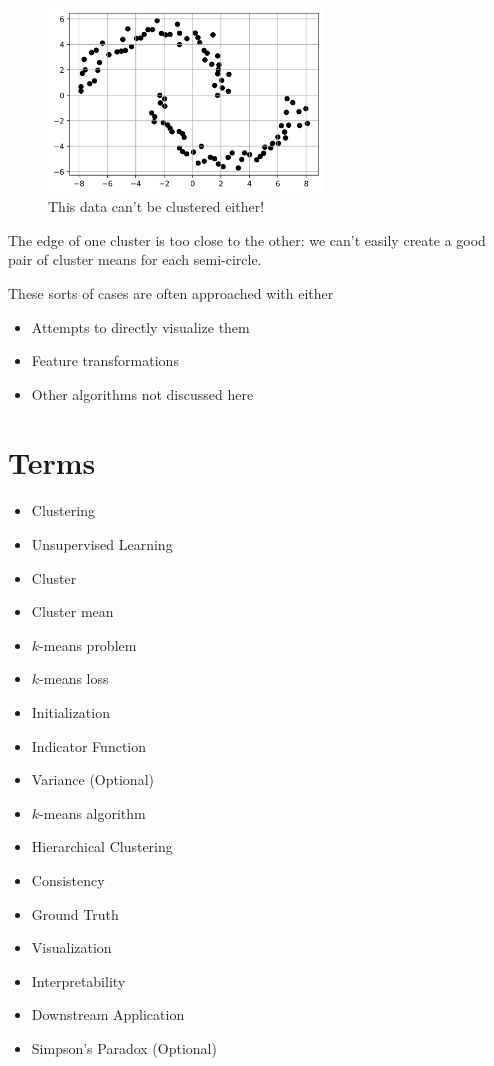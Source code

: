         \begin{figure}[h]
            \centering
            \includegraphics[width=0.65\textwidth]{images/clustering_images/offset_unclusterable.png}
            \caption*{This data can't be clustered either!}
        \end{figure}
        
        The edge of one cluster is too close to the other: we can't easily create a good pair of cluster means for each semi-circle.

        These sorts of cases are often approached with either

        \begin{itemize}
            \item Attempts to directly visualize them
            \item Feature transformations
            \item Other algorithms not discussed here
        \end{itemize}
        
\section{Terms}

    \begin{itemize}
        \item Clustering
        \item Unsupervised Learning
        \item Cluster
        \item Cluster mean
        \item $k$-means problem
        \item $k$-means loss
        \item Initialization
        \item Indicator Function
        \item Variance (Optional)
        \item $k$-means algorithm
        \item Hierarchical Clustering
        \item Consistency
        \item Ground Truth
        \item Visualization
        \item Interpretability
        \item Downstream Application
        \item Simpson's Paradox (Optional)
    \end{itemize}
    
    


 
